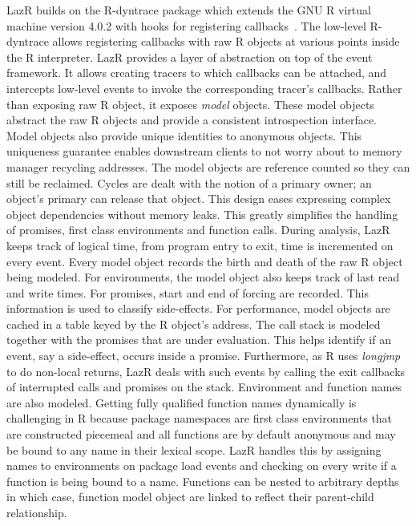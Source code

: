 \documentclass[review,nonacm,screen,acmsmall,anonymous=true]{acmart}
\newcommand{\rdyn}{{\sf R-dyntrace}\xspace}
\newcommand{\lazr}{{\sf LazR}\xspace}
\begin{document}
\lazr builds on the \rdyn package which extends the GNU R
virtual machine version 4.0.2 with hooks for registering
callbacks~\cite{oopsla19b}.
The low-level \rdyn allows registering callbacks with raw R objects at various
points inside the R interpreter.
\lazr provides a layer of abstraction on top of the event framework. It allows
creating tracers to which callbacks can be attached, and intercepts low-level
events to invoke the corresponding tracer's callbacks. Rather than exposing raw
R object, it exposes \emph{model} objects. These model objects abstract the raw
R objects and provide a consistent introspection interface. Model objects also
provide unique identities to anonymous objects. This uniqueness guarantee
enables downstream clients to not worry about to memory manager recycling
addresses. The model objects are reference counted so they can still be
reclaimed. Cycles are dealt with the notion of a primary owner; an object's
primary can release that object. This design eases expressing complex object
dependencies without memory leaks. This greatly simplifies the handling of
promises, first class environments and function calls.
During analysis, \lazr keeps track of logical time, from program entry to exit,
time is incremented on every event. Every model object records the birth and
death of the raw R object being modeled. For environments, the model object also
keeps track of last read and write times. For promises, start and end of forcing
are recorded. This information is used to classify side-effects.
%
For performance, model objects are cached in a table keyed by the R object's
address.
The call stack is modeled together with the promises that are under
evaluation. This helps identify if an event, say a side-effect, occurs inside a
promise. Furthermore, as R uses \emph{longjmp} to do non-local returns, \lazr
deals with such events by calling the exit callbacks of interrupted calls and
promises on the stack. Environment and function names are also modeled. Getting
fully qualified function names dynamically is challenging in R because package
namespaces are first class environments that are constructed piecemeal and all
functions are by default anonymous and may be bound to any name in their lexical
scope. \lazr handles this by assigning names to environments on package load
events and checking on every write if a function is being bound to a name.
Functions can be nested to arbitrary depths in which case, function model object
are linked to reflect their parent-child relationship.
\end{document}
